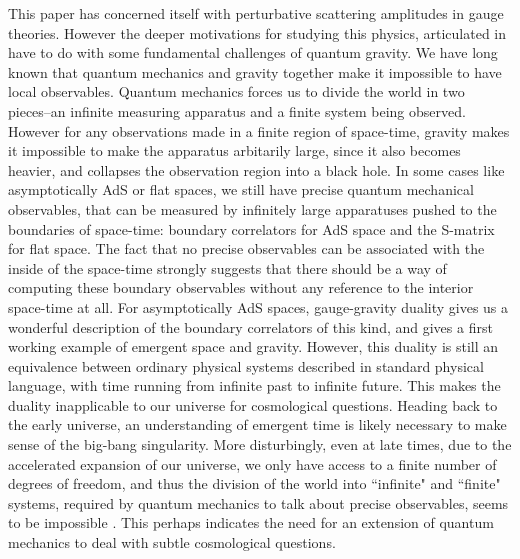 \documentclass[12pt,nohyper,twosided]{JHEP3}
\begin{document}
This paper has concerned itself with perturbative  scattering
amplitudes in gauge theories. However the deeper motivations for
studying this physics, articulated in \cite{N1,N2} have to do with
some fundamental challenges of quantum gravity. We have long known
that quantum mechanics and gravity together make it impossible to
have local observables. Quantum mechanics forces us to divide the
world in two pieces--an infinite measuring apparatus and a finite
system being observed. However for any observations made in a finite
region of space-time, gravity makes it impossible to make the
apparatus arbitarily large, since it also becomes heavier, and
collapses the observation region into a black hole. In some cases
like asymptotically AdS or flat spaces, we still have precise
quantum mechanical observables, that can be measured by infinitely
large apparatuses pushed to the boundaries of space-time: boundary
correlators for AdS space and the S-matrix for flat space. The fact
that no precise observables can be associated with the inside of the
space-time strongly suggests that there should be a way of computing
these boundary observables without any reference to the interior
space-time at all. For asymptotically AdS spaces, gauge-gravity
duality \cite{Maldacena:1997re} gives us a wonderful description of
the boundary correlators of this kind, and gives a first working
example of emergent space and gravity. However, this duality is
still an equivalence between ordinary physical systems described in
standard physical language, with time running from infinite past to
infinite future. This makes the duality inapplicable to our universe
for cosmological questions. Heading back to the early universe,  an
understanding of emergent time is likely necessary to make sense of
the big-bang singularity. More disturbingly, even at late times, due
to the accelerated expansion of our universe,  we only have access
to a finite number of degrees of freedom, and thus the division of
the world into ``infinite" and ``finite" systems, required by
quantum mechanics to talk about precise observables, seems to be
impossible \cite{Witten:2001kn}. This perhaps indicates the need for
 an extension of quantum mechanics to deal with subtle cosmological questions.
\end{document}
